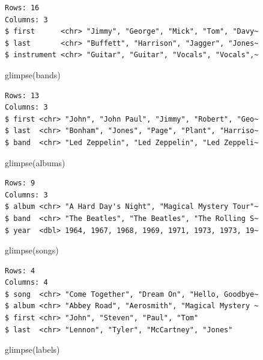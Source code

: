 \documentclass[
]{book}
\newenvironment{Shaded}{\begin{snugshade}}{\end{snugshade}}
\newcommand{\FunctionTok}[1]{\textcolor[rgb]{0.00,0.00,0.00}{#1}}
\newcommand{\NormalTok}[1]{#1}
\begin{document}
\begin{verbatim}
Rows: 16
Columns: 3
$ first      <chr> "Jimmy", "George", "Mick", "Tom", "Davy~
$ last       <chr> "Buffett", "Harrison", "Jagger", "Jones~
$ instrument <chr> "Guitar", "Guitar", "Vocals", "Vocals",~
\end{verbatim}

\begin{Shaded}
\begin{Highlighting}[]
\FunctionTok{glimpse}\NormalTok{(bands)}
\end{Highlighting}
\end{Shaded}

\begin{verbatim}
Rows: 13
Columns: 3
$ first <chr> "John", "John Paul", "Jimmy", "Robert", "Geo~
$ last  <chr> "Bonham", "Jones", "Page", "Plant", "Harriso~
$ band  <chr> "Led Zeppelin", "Led Zeppelin", "Led Zeppeli~
\end{verbatim}

\begin{Shaded}
\begin{Highlighting}[]
\FunctionTok{glimpse}\NormalTok{(albums)}
\end{Highlighting}
\end{Shaded}

\begin{verbatim}
Rows: 9
Columns: 3
$ album <chr> "A Hard Day's Night", "Magical Mystery Tour"~
$ band  <chr> "The Beatles", "The Beatles", "The Rolling S~
$ year  <dbl> 1964, 1967, 1968, 1969, 1971, 1973, 1973, 19~
\end{verbatim}

\begin{Shaded}
\begin{Highlighting}[]
\FunctionTok{glimpse}\NormalTok{(songs)}
\end{Highlighting}
\end{Shaded}

\begin{verbatim}
Rows: 4
Columns: 4
$ song  <chr> "Come Together", "Dream On", "Hello, Goodbye~
$ album <chr> "Abbey Road", "Aerosmith", "Magical Mystery ~
$ first <chr> "John", "Steven", "Paul", "Tom"
$ last  <chr> "Lennon", "Tyler", "McCartney", "Jones"
\end{verbatim}

\begin{Shaded}
\begin{Highlighting}[]
\FunctionTok{glimpse}\NormalTok{(labels)}
\end{Highlighting}
\end{Shaded}
\end{document}
